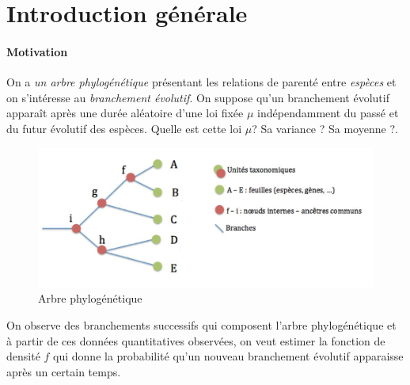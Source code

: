 \documentclass[
]{article}
\author{Wiam Chaoui Stéphane Sadio Sophie Manuel}
\date{}
\begin{document}
\newtheorem{definition}{Définition}
\newtheorem{exemple}{Exemple}
\newtheorem{corollary}{Corollaire}
\newtheorem*{proposition}{Proposition}
\newtheorem{lemma}{Lemme}
\newtheorem*{demonstration}{Démonstration}
\newtheorem{remark}{Remarque}
\newtheorem{propetie}{Propriété}
\newtheorem{theorem}{Théorème}
\newpage
\tableofcontents
\newpage

\section{Introduction générale}


\paragraph{Motivation}

\hspace*{0.5cm} On a \emph{un arbre phylogénétique} présentant les
relations de parenté entre \emph{espèces} et on s'intéresse au
\emph{branchement évolutif}. On suppose qu'un branchement évolutif
apparaît après une durée aléatoire d'une loi fixée \(\mu\)
indépendamment du passé et du futur évolutif des espèces.
\newline Quelle est cette loi \(\mu\)? Sa variance ? Sa moyenne
?.\newline

\begin{figure}
\centering
\includegraphics{Images/arbre_intro.jpg}
\caption{Arbre phylogénétique}
\end{figure}

\hspace*{0.5cm}

On observe des branchements successifs qui composent l'arbre
phylogénétique et à partir de ces données quantitatives observées, on
veut estimer la fonction de densité \(f\) qui donne la probabilité qu'un
nouveau branchement évolutif apparaisse après un certain temps.
\end{document}
